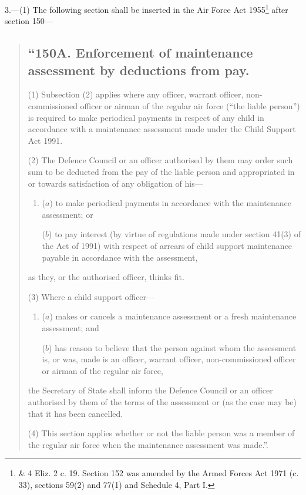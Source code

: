 \documentclass[a4paper]{article}
\begin{document}
3.—(1) The following section shall be inserted in the Air Force Act 1955\footnote{ \& 4 Eliz. 2 c. 19. Section 152 was amended by the Armed Forces Act 1971 (c. 33), sections 59(2) and 77(1) and Schedule 4, Part I.} after section 150—
\begin{quotation}
\subsection*{“150A. Enforcement of maintenance assessment by deductions from pay.}

(1) Subsection (2) applies where any officer, warrant officer, non-commissioned officer or airman of the regular air force (“the liable person”) is required to make periodical payments in respect of any child in accordance with a maintenance assessment made under the Child Support Act 1991.

(2) The Defence Council or an officer authorised by them may order such sum to be deducted from the pay of the liable person and appropriated in or towards satisfaction of any obligation of his—
\begin{enumerate}\item[]
($a$) to make periodical payments in accordance with the maintenance assessment; or

($b$) to pay interest (by virtue of regulations made under section 41(3) of the Act of 1991) with respect of arrears of child support maintenance payable in accordance with the assessment,
\end{enumerate}
as they, or the authorised officer, thinks fit.

(3) Where a child support officer—
\begin{enumerate}\item[]
($a$) makes or cancels a maintenance assessment or a fresh maintenance assessment; and

($b$) has reason to believe that the person against whom the assessment is, or was, made is an officer, warrant officer, non-commissioned officer or airman of the regular air force,
\end{enumerate}
the Secretary of State shall inform the Defence Council or an officer authorised by them of the terms of the assessment or (as the case may be) that it has been cancelled.

(4) This section applies whether or not the liable person was a member of the regular air force when the maintenance assessment was made.”.
\end{quotation}
\end{document}
